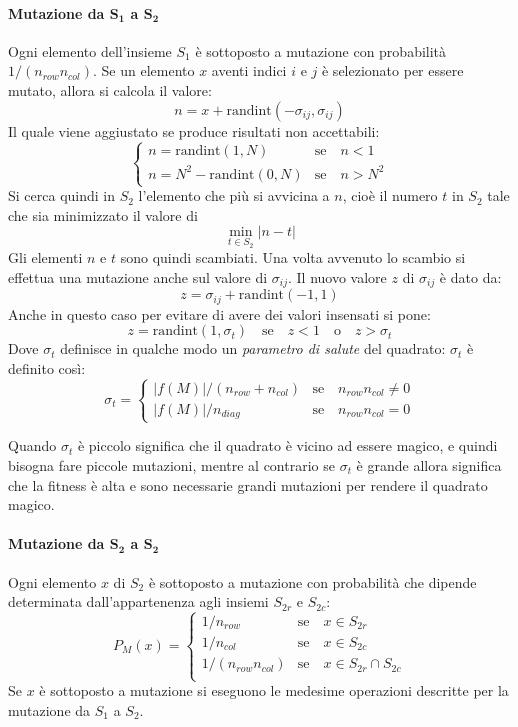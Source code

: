 \documentclass[italian,twoside,twocolumn]{article}
\begin{document}
\paragraph{Mutazione da $ \mathbf{S_1} $ a $ \mathbf{S_2} $}
Ogni elemento dell'insieme $ S_1 $ è sottoposto a mutazione con probabilità $ 1\slash(n_{row}n_{col}) $. Se un elemento $ x $ aventi indici $ i $ e $ j $ è selezionato per essere mutato, allora si calcola il valore:
\[ n = 	x + \text{randint}(-\sigma_{ij}, \sigma_{ij})  \]
Il quale viene aggiustato se produce risultati non accettabili:
\[
\begin{cases}
n = \text{randint}(1,N) & \text{se} \quad n < 1  \\
n = N^2 - \text{randint}(0,N) & \text{se} \quad n > N^2  
\end{cases}
\]
Si cerca quindi in $ S_2 $ l'elemento che più si avvicina a $ n $, cioè il numero $ t $ in $ S_2 $ tale che sia minimizzato il valore di 
\[\min_{t \in S_2} \lvert n - t \rvert \]
Gli elementi $ n $ e $ t $ sono quindi scambiati. Una volta avvenuto lo scambio si effettua una mutazione anche sul valore di $ \sigma_{ij} $.
Il nuovo valore $ z $ di $ \sigma_{ij} $ è dato da: 
\[ z = 	\sigma_{ij} + \text{randint}(-1, 1)  \]
Anche in questo caso per evitare di avere dei valori insensati si pone:
\[
z = \text{randint}(1,\sigma_t) \quad \text{se} \quad z < 1 \quad \text{o} \quad  z > \sigma_t 
\]
Dove $ \sigma_t $ definisce in qualche modo un \emph{parametro di salute} del quadrato: 
$ \sigma_t $ è definito così:
\[ \sigma_t = 
\begin{cases}
\lvert f(M) \rvert \slash \left(n_{row} + n_{col}\right) & \text{se} \quad n_{row}n_{col} \not = 0  \\
\lvert f(M) \rvert \slash n_{diag} & \text{se} \quad n_{row}n_{col} = 0 
\end{cases}
\]

Quando $ \sigma_t $ è piccolo significa che il quadrato è vicino ad essere magico, e quindi bisogna fare piccole mutazioni, mentre al contrario se $ \sigma_t $ è grande allora significa che la fitness è alta e sono necessarie grandi mutazioni per rendere il quadrato magico.

\paragraph{Mutazione da $ \mathbf{S_2} $ a $ \mathbf{S_2} $}
Ogni elemento $ x $ di $ S_2 $ è sottoposto a mutazione con probabilità che dipende determinata dall'appartenenza agli insiemi $ S_{2r} $ e $ S_{2c} $:
\[ P_M(x) = 
\begin{cases}
1\slash n_{row} & \text{se} \quad x \in S_{2r} \\
1\slash n_{col} & \text{se} \quad x \in S_{2c} \\
1\slash \left(n_{row} n_{col} \right) & \text{se} \quad x \in S_{2r} \cap S_{2c} \\
\end{cases}
\]
Se $ x $ è sottoposto a mutazione si eseguono le medesime operazioni descritte per la mutazione da $ S_1 $ a $ S_2 $.
\end{document}
